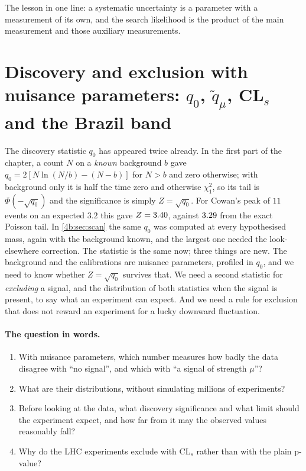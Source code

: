 The lesson in one line: a systematic uncertainty is a parameter with a measurement of
its own, and the search likelihood is the product of the main measurement and those
auxiliary measurements.

\section[Discovery and exclusion: $q_0$, $\tilde q_\mu$, CL$_s$, Brazil band]{Discovery and exclusion with nuisance parameters: $q_0$, $\tilde q_\mu$, CL$_s$ and the Brazil band}
\label{4b:sec:limits}

The discovery statistic $q_0$ has appeared twice already. In the first part of the
chapter, a count $N$ on a \emph{known} background $b$ gave
$q_0=2[N\ln(N/b)-(N-b)]$ for $N>b$ and zero otherwise; with background only it is
half the time zero and otherwise $\chi^2_1$, so its tail is $\Phi(-\sqrt{q_0})$ and the
significance is simply $Z=\sqrt{q_0}$. For Cowan's peak of $11$ events on an expected $3.2$ this gave
$Z=3.40$, against $3.29$ from the exact Poisson tail. In
\cref{4b:sec:scan} the same $q_0$ was computed at every hypothesised mass, again with
the background known, and the largest one needed the look-elsewhere correction. The
statistic is the same now; three things are new. The background and the calibrations
are nuisance parameters, profiled in $q_0$, and we need to know whether
$Z=\sqrt{q_0}$ survives that. We need a second statistic for \emph{excluding} a
signal, and the distribution of both statistics when the signal is present, to say
what an experiment can expect. And we need a rule for exclusion that does not reward
an experiment for a lucky downward fluctuation.

\paragraph{The question in words.}
\begin{enumerate}[label=\arabic*.]
  \item With nuisance parameters, which number measures how badly the data disagree
        with ``no signal'', and which with ``a signal of strength $\mu$''?
  \item What are their distributions, without simulating millions of experiments?
  \item Before looking at the data, what discovery significance and what limit should
        the experiment expect, and how far from it may the observed values reasonably
        fall?
  \item Why do the LHC experiments exclude with CL$_s$ rather than with the plain
        p-value?
\end{enumerate}

